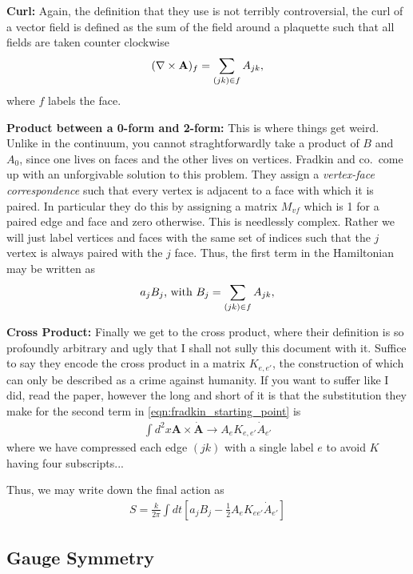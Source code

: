 \documentclass[11pt, oneside]{article} %
\numberwithin{equation}{section}
\begin{document}
\textbf{Curl: } Again, the definition that they use is not terribly controversial, the curl of a vector field is defined as the sum of the field around a plaquette such that all fields are taken counter clockwise
\begin{align}
    (\nabla \times \textbf A)_f = \sum_{(jk) \in f} A_{jk},
\end{align}
where $f$ labels the face.

\textbf{Product between a 0-form and 2-form: }This is where things get weird. Unlike in the continuum, you cannot straghtforwardly take a product of $B$ and $A_0$, since one lives on faces and the other lives on vertices. Fradkin and co.~come up with an unforgivable solution to this problem. They assign a \textit{vertex-face correspondence} such that every vertex is adjacent to a face with which it is paired. In particular they do this by assigning a matrix $M_{vf}$ which is 1 for a paired edge and face and zero otherwise. This is needlessly complex. Rather we will just label vertices and faces with the same set of indices such that the $j$ vertex is always paired with the $j$ face. Thus, the first term in the Hamiltonian may be written as 
\begin{align}
    a_j B_j\textup{, with } B_j = \sum_{(jk) \in f} A_{jk},
\end{align}

\textbf{Cross Product: } Finally we get to the cross product, where their definition is so profoundly arbitrary and ugly that I shall not sully this document with it. Suffice to say they encode the cross product in a matrix $K_{e,e'}$, the construction of which can only be described as a crime against humanity. If you want to suffer like I did, read the paper, however the long and short of it is that the substitution they make for the second term in \cref{eqn:fradkin_starting_point} is 
\begin{align}
    \int d^2x \textbf {A} \times \dot {\textbf {A}} 
    \rightarrow 
    A_e K_{e,e'} \dot A_{e'}
\end{align}
where we have compressed each edge $(jk)$ with a single label $e$ to avoid $K$ having four subscripts...

Thus, we may write down the final action as 
\begin{align}
    S = \frac k{2\pi} \int dt \left [ 
    a_j B_j - \frac 12 A_e K_{ee'} \dot A_{e'}
    \right ]
\end{align}

\subsection{Gauge Symmetry}
\end{document}
